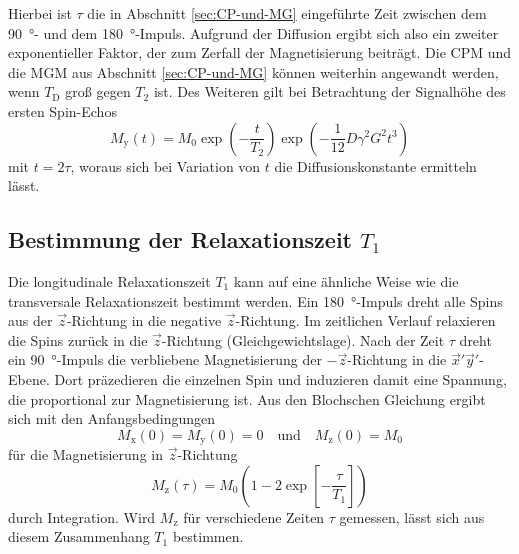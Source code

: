 Hierbei ist $\tau$ die in Abschnitt \ref{sec:CP-und-MG} eingeführte Zeit zwischen
dem \SI{90}{\degree}- und dem \SI{180}{\degree}-Impuls.
Aufgrund der Diffusion ergibt sich also ein zweiter exponentieller Faktor, der
zum Zerfall der Magnetisierung beiträgt.
Die CPM und die MGM aus Abschnitt \ref{sec:CP-und-MG} können weiterhin
angewandt werden, wenn $T_\text{D}$ groß gegen $T_2$ ist.
Des Weiteren gilt bei Betrachtung der Signalhöhe des ersten Spin-Echos
\begin{equation}
  M_\text{y}\!\left(t\right) = M_0
  \exp\!\left(-\frac{t}{T_2}\right)
  \exp\!\left(-\frac{1}{12} D \gamma^2 G^2 t^3\right)
  \label{eqn:DiffusionsBestimmung}
\end{equation}
mit $t = 2\tau$,
woraus sich bei Variation von $t$ die Diffusionskonstante ermitteln lässt.


\subsection{Bestimmung der Relaxationszeit \texorpdfstring{$T_1$}{T1}}
\label{sec:T1Theo}

Die longitudinale Relaxationszeit $T_1$ kann auf eine ähnliche Weise wie die
transversale Relaxationszeit bestimmt werden.
Ein \SI{180}{\degree}-Impuls dreht alle Spins aus der $\vec{z}$-Richtung in
die negative $\vec{z}$-Richtung. Im zeitlichen Verlauf relaxieren die Spins zurück
in die $\vec{z}$-Richtung (Gleichgewichtslage).
Nach der Zeit $\tau$ dreht ein \SI{90}{\degree}-Impuls die verbliebene Magnetisierung
der $-\vec{z}$-Richtung in die $\vec{x}'\vec{y}'$-Ebene.
Dort präzedieren die einzelnen Spin und induzieren damit eine Spannung, die
proportional zur Magnetisierung ist.
Aus den Blochschen Gleichung ergibt sich mit den Anfangsbedingungen
\begin{equation*}
  M_\text{x}\!\left(0\right) = M_\text{y}\!\left(0\right) = 0
  \quad \text{und} \quad M_\text{z}\!\left(0\right) = M_0
\end{equation*}
für die Magnetisierung in $\vec{z}$-Richtung
\begin{equation}
  M_\text{z}\!\left(\tau\right) =
  M_0 \left(1 - 2 \exp\!\left[-\frac{\tau}{T_1}\right]\right)
  \label{eqn:T1-Vermessung}
\end{equation}
durch Integration.
Wird $M_\text{z}$ für verschiedene Zeiten $\tau$ gemessen, lässt sich aus diesem
Zusammenhang $T_1$ bestimmen.
